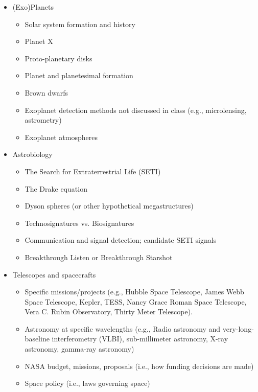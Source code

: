 \documentclass[12pt]{article}
\begin{document}
\begin{itemize}[noitemsep]
    \item (Exo)Planets
        \begin{itemize}[noitemsep]
            \item Solar system formation and history
            \item Planet X
            \item Proto-planetary disks
            \item Planet and planetesimal formation
            \item Brown dwarfs
            \item Exoplanet detection methods not discussed in class (e.g., microlensing, astrometry)
            \item Exoplanet atmospheres
        \end{itemize}
    
    \item Astrobiology
    \begin{itemize}[noitemsep]
        \item The Search for Extraterrestrial Life (SETI)
        \item The Drake equation
        \item Dyson spheres (or other hypothetical megastructures)
        \item Technosignatures vs. Biosignatures
        \item Communication and signal detection; candidate SETI signals
        \item Breakthrough Listen or Breakthrough Starshot
    \end{itemize}
    
    \item Telescopes and spacecrafts
        \begin{itemize}[noitemsep]
            \item Specific missions/projects (e.g., Hubble Space Telescope, James Webb Space Telescope, Kepler, TESS, Nancy Grace Roman Space Telescope, Vera C. Rubin Observatory, Thirty Meter Telescope).
            \item Astronomy at specific wavelengths (e.g., Radio astronomy and very-long-baseline interferometry (VLBI), sub-millimeter astronomy, X-ray astronomy, gamma-ray astronomy)
            \item NASA budget, missions, proposals (i.e., how funding decisions are made)
            \item Space policy (i.e., laws governing space)
        \end{itemize}


\end{itemize}
\end{document}

